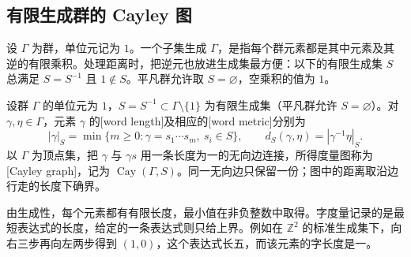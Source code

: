 \subsection{有限生成群的 Cayley 图}
\label{g3:subsec:D01:01}

设 \(\Gamma\) 为群，单位元记为 \(1\)。一个子集生成 \(\Gamma\)，是指每个群元素都是其中元素及其逆的有限乘积。处理距离时，把逆元也放进生成集最方便：以下的有限生成集 \(S\) 总满足 \(S=S^{-1}\) 且 \(1\notin S\)。平凡群允许取 \(S=\varnothing\)，空乘积的值为 \(1\)。

\begin{definition}\label{g3:def:D-word-metric}
	设群 \(\Gamma\) 的单位元为 \(1\)，\(S=S^{-1}\subset\Gamma\setminus\{1\}\) 为有限生成集（平凡群允许 \(S=\varnothing\)）。对 \(\gamma,\eta\in\Gamma\)，元素 \(\gamma\) 的[word length]及相应的[word metric]分别为
	\[
		|\gamma|_S=\min\{m\ge0:\gamma=s_1\cdots s_m,\ s_i\in S\},
		\qquad d_S(\gamma,\eta)=|\gamma^{-1}\eta|_S.
	\]
	以 \(\Gamma\) 为顶点集，把 \(\gamma\) 与 \(\gamma s\) 用一条长度为一的无向边连接，所得度量图称为[Cayley graph]，记为 \(\operatorname{Cay}(\Gamma,S)\)。同一无向边只保留一份；图中的距离取沿边行走的长度下确界。
\end{definition}

由生成性，每个元素都有有限长度，最小值在非负整数中取得。字度量记录的是最短表达式的长度，给定的一条表达式则只给上界。例如在 \(\mathbb Z^2\) 的标准生成集下，向右三步再向左两步得到 \((1,0)\)，这个表达式长五，而该元素的字长度是一。

